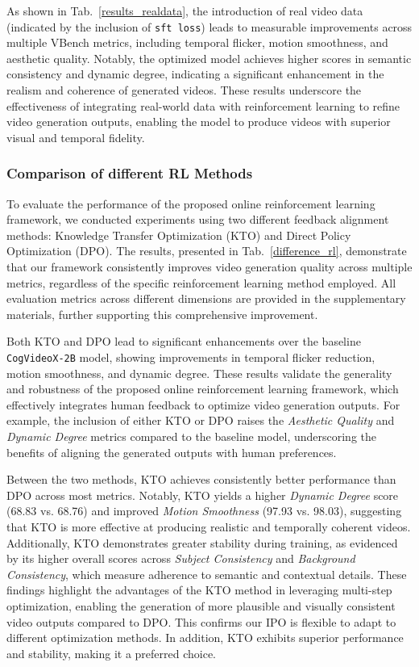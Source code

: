As shown in Tab.~\ref{results_realdata}, the introduction of real video data (indicated by the inclusion of \texttt{sft loss}) leads to measurable improvements across multiple VBench metrics, including temporal flicker, motion smoothness, and aesthetic quality. Notably, the optimized model achieves higher scores in semantic consistency and dynamic degree, indicating a significant enhancement in the realism and coherence of generated videos. These results underscore the effectiveness of integrating real-world data with reinforcement learning to refine video generation outputs, enabling the model to produce videos with superior visual and temporal fidelity.



\subsubsection{Comparison of different RL Methods}
To evaluate the performance of the proposed online reinforcement learning framework, we conducted experiments using two different feedback alignment methods: Knowledge Transfer Optimization (KTO) and Direct Policy Optimization (DPO). The results, presented in Tab.~\ref{difference_rl}, demonstrate that our framework consistently improves video generation quality across multiple metrics, regardless of the specific reinforcement learning method employed. All evaluation metrics across different dimensions are provided in the supplementary materials, further supporting this comprehensive improvement.

Both KTO and DPO lead to significant enhancements over the baseline \texttt{CogVideoX-2B} model, showing improvements in temporal flicker reduction, motion smoothness, and dynamic degree. These results validate the generality and robustness of the proposed online reinforcement learning framework, which effectively integrates human feedback to optimize video generation outputs. For example, the inclusion of either KTO or DPO raises the \textit{Aesthetic Quality} and \textit{Dynamic Degree} metrics compared to the baseline model, underscoring the benefits of aligning the generated outputs with human preferences.

Between the two methods, KTO achieves consistently better performance than DPO across most metrics. Notably, KTO yields a higher \textit{Dynamic Degree} score (68.83 vs. 68.76) and improved \textit{Motion Smoothness} (97.93 vs. 98.03), suggesting that KTO is more effective at producing realistic and temporally coherent videos. Additionally, KTO demonstrates greater stability during training, as evidenced by its higher overall scores across \textit{Subject Consistency} and \textit{Background Consistency}, which measure adherence to semantic and contextual details. These findings highlight the advantages of the KTO method in leveraging multi-step optimization, enabling the generation of more plausible and visually consistent video outputs compared to DPO. This confirms our IPO is flexible to adapt to different optimization methods. In addition, KTO exhibits superior performance and stability, making it a preferred choice.

